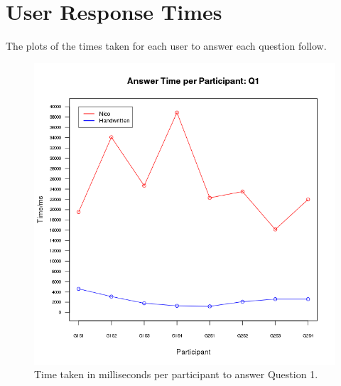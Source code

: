 \documentclass[12pt,twoside,notitlepage,xetex]{report}
\begin{document}

\cleardoublepage

\appendix

\chapter{User Response Times}

The plots of the times taken for each user to answer each question follow.

\begin{center}
\begin{figure}[H]
\begin{center}
\includegraphics[height=\textheight/2-2cm]{figs/graphs/q1.png}
\end{center}
\caption{Time taken in milliseconds per participant to answer Question 1.}
\end{figure}
\end{center}
\end{document}
